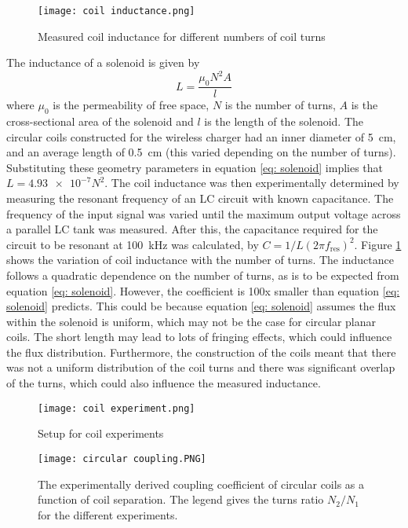 \begin{figure}[htbp]
	\centering
	\texttt{[image: coil inductance.png]}
	\caption{Measured coil inductance for different numbers of coil turns}
	\label{fig: coil inductance}
\end{figure}

The inductance of a solenoid is given by 
\begin{equation}\label{eq: solenoid}
L = \frac{\mu_0 N^2 A}{l}
\end{equation}
where $\mu_0$ is the permeability of free space, $N$ is the number of turns, $A$ is the cross-sectional area of the solenoid and $l$ is the length of the solenoid. The circular coils constructed for the wireless charger had an inner diameter of \SI{5}{\centi\metre}, and an average length of \SI{0.5}{\centi\metre} (this varied depending on the number of turns). Substituting these geometry parameters in equation \ref{eq: solenoid} implies that $L=\num{4.93e-7}N^2$. The coil inductance was then experimentally determined by measuring the resonant frequency of an LC circuit with known capacitance. The frequency of the input signal was varied until the maximum output voltage across a parallel LC tank was measured. After this, the capacitance required for the circuit to be resonant at \SI{100}{\kilo\hertz} was calculated, by $C = 1/L(2\pi f_\text{res})^2$. Figure \ref{fig: coil inductance} shows the variation of coil inductance with the number of turns. The inductance follows a quadratic dependence on the number of turns, as is to be expected from equation \ref{eq: solenoid}. However, the coefficient is 100x smaller than equation \ref{eq: solenoid} predicts. This could be because equation \ref{eq: solenoid} assumes the flux within the solenoid is uniform, which may not be the case for circular planar coils. The short length may lead to lots of fringing effects, which could influence the flux distribution. Furthermore, the construction of the coils meant that there was not a uniform distribution of the coil turns and there was significant overlap of the turns, which could also influence the measured inductance.\\

\begin{figure}[htbp]
	\centering
	\texttt{[image: coil experiment.png]}
	\caption{Setup for coil experiments}
	\label{fig: coil experiment setup}
\end{figure}
\begin{figure}[htbp]
	\centering
	\texttt{[image: circular coupling.PNG]}
	\caption{The experimentally derived coupling coefficient of circular coils as a function of coil separation. The legend gives the turns ratio $N_2/N_1$ for the different experiments.}
	\label{fig: circular coupling}
\end{figure}


